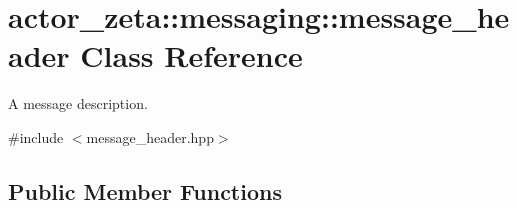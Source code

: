\hypertarget{classactor__zeta_1_1messaging_1_1message__header}{}\section{actor\+\_\+zeta\+:\+:messaging\+:\+:message\+\_\+header Class Reference}
\label{classactor__zeta_1_1messaging_1_1message__header}


A message description.  




{\ttfamily \#include $<$message\+\_\+header.\+hpp$>$}

\subsection*{Public Member Functions}
